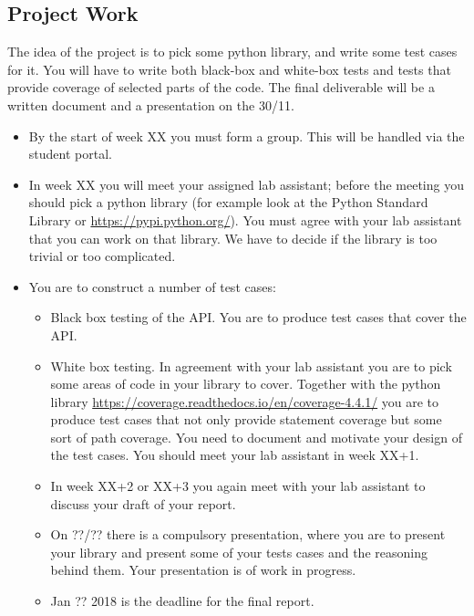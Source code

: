 \documentclass[a4page]{article}
\begin{document}
\subsection{Project Work}

The idea of the project is to pick some python library, and write some
test cases for it. You will have to write both black-box and white-box
tests and tests that provide coverage of selected parts of the
code. The final deliverable will be a written document and a
presentation on the 30/11. 
  \begin{itemize}
  \item By  the start of  week  XX you must form a group. This will be
    handled via the student portal.
  \item In week XX you will meet your assigned lab assistant; before the
    meeting you should pick a python library (for example look at the Python
    Standard Library or \url{https://pypi.python.org/}). You must agree
    with your lab assistant that you can work on that library. We have
    to decide if the library is too trivial or too complicated.
  \item You are to construct a number of test cases:
    \begin{itemize}
    \item  Black box testing of the API. You are to produce test cases
      that cover the API.
    \item  White box testing. In agreement with your lab assistant you
      are to pick some areas of code in your library to cover. Together with
      the python library
      \url{https://coverage.readthedocs.io/en/coverage-4.4.1/} you are
      to produce test cases that not only provide statement coverage
      but some sort of path coverage. You need to document and
      motivate your design of the test cases. You should meet your lab
      assistant in week XX+1.
    \item In week XX+2 or XX+3 you again meet with your lab assistant to
      discuss your draft of your  report.
    \item On ??/?? there is a compulsory presentation, where you are
      to present your library and present some of your tests cases
      and the reasoning behind them. Your presentation is of work in
      progress. 
    \item Jan ?? 2018 is  the deadline for the final
      report. 
    \end{itemize}
  \end{itemize}
\end{document}

